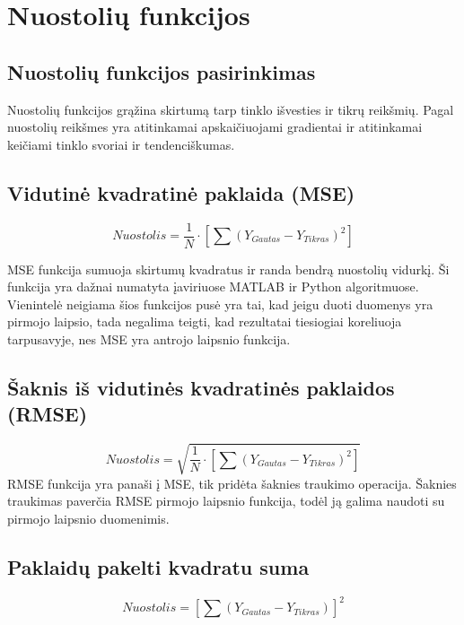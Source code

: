 \documentclass{VUMIFInfKursinis}
\begin{document}


\section{Nuostolių funkcijos}

\subsection{Nuostolių funkcijos pasirinkimas}





\par
Nuostolių funkcijos grąžina skirtumą tarp tinklo išvesties ir tikrų reikšmių. Pagal
nuostolių reikšmes yra atitinkamai apskaičiuojami gradientai ir atitinkamai
keičiami tinklo svoriai ir tendenciškumas.

\subsection{Vidutinė kvadratinė paklaida (MSE)}
\[
  Nuostolis = \frac{1}{N} \cdot [\sum(Y_{Gautas}-Y_{Tikras})^{2}]
\]
\par
MSE funkcija sumuoja skirtumų kvadratus ir randa bendrą nuostolių vidurkį.
Ši funkcija yra dažnai numatyta įaviriuose MATLAB ir Python algoritmuose.
Vienintelė neigiama šios funkcijos pusė yra tai, kad jeigu duoti duomenys yra pirmojo
laipsio, tada negalima teigti, kad rezultatai tiesiogiai koreliuoja tarpusavyje,
nes MSE yra antrojo laipsnio funkcija. \cite{salt12}

\subsection{Šaknis iš vidutinės kvadratinės paklaidos (RMSE)}
\[
  Nuostolis = \sqrt{\frac{1}{N} \cdot [\sum (Y_{Gautas}-Y_{Tikras})^{2}]}
\]
RMSE funkcija yra panaši į MSE, tik pridėta šaknies traukimo operacija.
Šaknies traukimas paverčia RMSE pirmojo laipsnio funkcija, todėl ją galima naudoti
su pirmojo laipsnio duomenimis. \cite{salt12}

\subsection{Paklaidų pakelti kvadratu suma}
\[
  Nuostolis = [\sum(Y_{Gautas} - Y_{Tikras})]^{2}
\]
\end{document}
